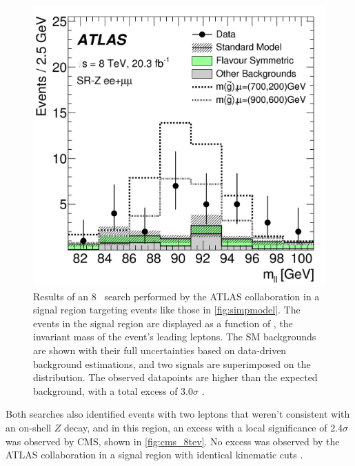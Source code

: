 \begin{centering}
\begin{figure}[!hbt]
\myfloatalign
\includegraphics[width=.9\linewidth]{figures/theory/figaux_12a.png}
\caption{ Results of an 8 \tev~search performed by the ATLAS collaboration in a signal region targeting events like those in \autoref{fig:simpmodel}. The events in the signal region are displayed as a function of \mll, the invariant mass of the event's leading leptons. The \ac{SM} backgrounds are shown with their full uncertainties based on data-driven background estimations, and two signals are superimposed on the distribution. The observed datapoints are higher than the expected background, with a total excess of 3.0$\sigma$ \cite{SUSY-2014-10}.}
\label{fig:atlas_8tev}
\end{figure}
\end{centering}

Both searches also identified events with two leptons that weren't consistent with an on-shell $Z$ decay, and in this region, an excess with a local significance of 2.4$\sigma$ was observed by \ac{CMS}, shown in \autoref{fig:cms_8tev}. No excess was observed by the ATLAS collaboration in a signal region with identical kinematic cuts \cite{SUSY-2014-10}. 

